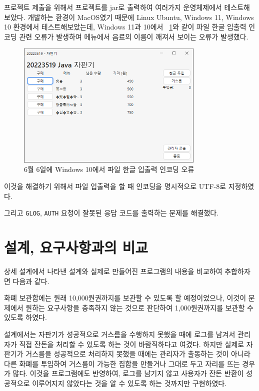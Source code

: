\documentclass{oblivoir}
\newcommand{\figref}[1]{\figurename~\ref{#1}}
\begin{document}
    프로젝트 제출을 위해서 프로젝트를 jar로 출력하여 여러가지 운영체제에서 테스트해보았다.
    개발하는 환경이 MacOS였기 때문에 Linux Ubuntu, Windows 11, Windows 10 환경에서 테스트해보았는데,
    Windows 11과 10에서 \figref{fig:0606-windows}와 같이 파일 한글 입출력 인코딩 관련 오류가 발생하여 메뉴에서 음료의 이름이
    깨져서 보이는 오류가 발생했다.

    \begin{figure}[h]
        \centering
        \includegraphics[width=0.8\textwidth]{images/dev-snapshop/0606-windows}
        \caption{6월 6일에 Windows 10에서 파일 한글 입출력 인코딩 오류}
        \label{fig:0606-windows}
    \end{figure}

    이것을 해결하기 위해서 파일 입출력을 할 때 인코딩을 명시적으로 UTF-8로 지정하였다.

    그리고 \texttt{GLOG}, \texttt{AUTH} 요청이 잘못된 응답 코드를 출력하는 문제를 해결했다.

    \section{설계, 요구사항과의 비교}

    상세 설계에서 나타낸 설계와 실제로 만들어진 프로그램의 내용을 비교하여 추합하자면 다음과 같다.

    화폐 보관함에는 원래 10,000원권까지를 보관할 수 있도록 할 예정이었으나,
    이것이 문제에서 원하는 요구사항을 충족하지 않는 것으로 판단하여 1,000원권까지를 보관할 수 있도록 하였다.

    설계에서는 자판기가 성공적으로 거스름을 수행하지 못했을 때에
    로그를 남겨서 관리자가 직접 잔돈을 처리할 수 있도록 하는 것이 바람직하다고 여겼다.
    하지만 실제로 자판기가 거스름을 성공적으로 처리하지 못했을 때에는
    관리자가 출동하는 것이 아니라 다른 화폐를 투입하여 거스름이 가능한 집합을 만들거나
    그대로 두고 자리를 뜨는 경우가 많다.
    이것을 프로그램에도 반영하여,
    로그를 남기지 않고 사용자가 잔돈 반환이 성공적으로 이루어지지 않았다는 것을
    알 수 있도록 하는 것까지만 구현하였다.
\end{document}
